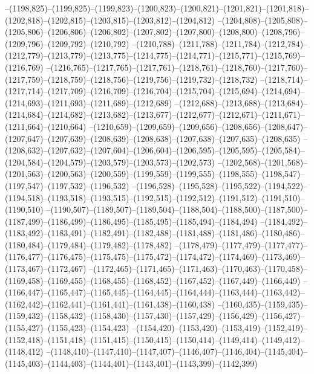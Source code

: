 --(1198,825)--(1199,825)--(1199,823)--(1200,823)--(1200,821)--(1201,821)--(1201,818)--(1202,818)--(1202,815)--(1203,815)--(1203,812)--(1204,812)
--(1204,808)--(1205,808)--(1205,806)--(1206,806)--(1206,802)--(1207,802)--(1207,800)--(1208,800)--(1208,796)--(1209,796)--(1209,792)--(1210,792)
--(1210,788)--(1211,788)--(1211,784)--(1212,784)--(1212,779)--(1213,779)--(1213,775)--(1214,775)--(1214,771)--(1215,771)--(1215,769)--(1216,769)
--(1216,765)--(1217,765)--(1217,761)--(1218,761)--(1218,760)--(1217,760)--(1217,759)--(1218,759)--(1218,756)--(1219,756)--(1219,732)--(1218,732)
--(1218,714)--(1217,714)--(1217,709)--(1216,709)--(1216,704)--(1215,704)--(1215,694)--(1214,694)--(1214,693)--(1211,693)--(1211,689)--(1212,689)
--(1212,688)--(1213,688)--(1213,684)--(1214,684)--(1214,682)--(1213,682)--(1213,677)--(1212,677)--(1212,671)--(1211,671)--(1211,664)--(1210,664)
--(1210,659)--(1209,659)--(1209,656)--(1208,656)--(1208,647)--(1207,647)--(1207,639)--(1208,639)--(1208,638)--(1207,638)--(1207,635)--(1208,635)
--(1208,632)--(1207,632)--(1207,604)--(1206,604)--(1206,595)--(1205,595)--(1205,584)--(1204,584)--(1204,579)--(1203,579)--(1203,573)--(1202,573)
--(1202,568)--(1201,568)--(1201,563)--(1200,563)--(1200,559)--(1199,559)--(1199,555)--(1198,555)--(1198,547)--(1197,547)--(1197,532)--(1196,532)
--(1196,528)--(1195,528)--(1195,522)--(1194,522)--(1194,518)--(1193,518)--(1193,515)--(1192,515)--(1192,512)--(1191,512)--(1191,510)--(1190,510)
--(1190,507)--(1189,507)--(1189,504)--(1188,504)--(1188,500)--(1187,500)--(1187,499)--(1186,499)--(1186,495)--(1185,495)--(1185,494)--(1184,494)
--(1184,492)--(1183,492)--(1183,491)--(1182,491)--(1182,488)--(1181,488)--(1181,486)--(1180,486)--(1180,484)--(1179,484)--(1179,482)--(1178,482)
--(1178,479)--(1177,479)--(1177,477)--(1176,477)--(1176,475)--(1175,475)--(1175,472)--(1174,472)--(1174,469)--(1173,469)--(1173,467)--(1172,467)
--(1172,465)--(1171,465)--(1171,463)--(1170,463)--(1170,458)--(1169,458)--(1169,455)--(1168,455)--(1168,452)--(1167,452)--(1167,449)--(1166,449)
--(1166,447)--(1165,447)--(1165,445)--(1164,445)--(1164,444)--(1163,444)--(1163,442)--(1162,442)--(1162,441)--(1161,441)--(1161,438)--(1160,438)
--(1160,435)--(1159,435)--(1159,432)--(1158,432)--(1158,430)--(1157,430)--(1157,429)--(1156,429)--(1156,427)--(1155,427)--(1155,423)--(1154,423)
--(1154,420)--(1153,420)--(1153,419)--(1152,419)--(1152,418)--(1151,418)--(1151,415)--(1150,415)--(1150,414)--(1149,414)--(1149,412)--(1148,412)
--(1148,410)--(1147,410)--(1147,407)--(1146,407)--(1146,404)--(1145,404)--(1145,403)--(1144,403)--(1144,401)--(1143,401)--(1143,399)--(1142,399)
